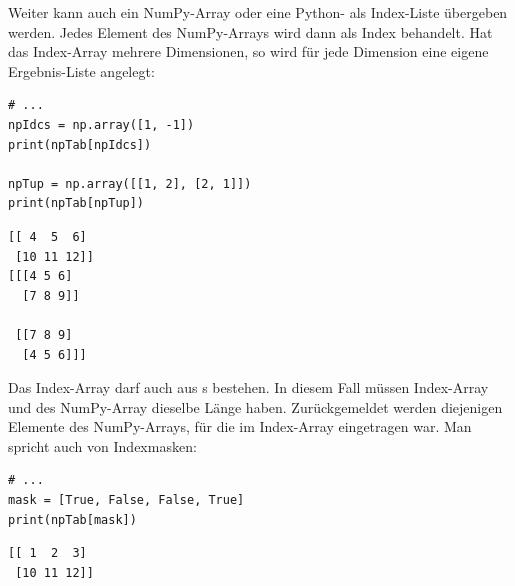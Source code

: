 Weiter kann auch ein NumPy-Array oder eine Python- als Index-Liste übergeben werden. Jedes Element des NumPy-Arrays wird dann als Index behandelt. Hat das Index-Array mehrere Dimensionen, so wird für jede Dimension eine eigene Ergebnis-Liste angelegt:

\begin{tcbraster}[raster columns=2,
                  raster equal height,
                  nobeforeafter,
                  raster column skip=0.5cm]
\begin{codebox}
\begin{verbatim}
# ...
npIdcs = np.array([1, -1])
print(npTab[npIdcs])

npTup = np.array([[1, 2], [2, 1]])
print(npTab[npTup])
\end{verbatim}
\end{codebox}
%
\begin{cmdbox}
\begin{verbatim}
[[ 4  5  6]
 [10 11 12]]
[[[4 5 6]
  [7 8 9]]

 [[7 8 9]
  [4 5 6]]]
\end{verbatim}
\end{cmdbox}
\end{tcbraster}

Das Index-Array darf auch aus s bestehen. In diesem Fall müssen Index-Array und des NumPy-Array dieselbe Länge haben. Zurückgemeldet werden diejenigen Elemente des NumPy-Arrays, für die im Index-Array  eingetragen war. Man spricht auch von Indexmasken:

\begin{tcbraster}[raster columns=2,
                  raster equal height,
                  nobeforeafter,
                  raster column skip=0.5cm]
\begin{codebox}
\begin{verbatim}
# ...
mask = [True, False, False, True]
print(npTab[mask])
\end{verbatim}
\end{codebox}
%
\begin{cmdbox}
\begin{verbatim}
[[ 1  2  3]
 [10 11 12]]
\end{verbatim}
\end{cmdbox}
\end{tcbraster}

